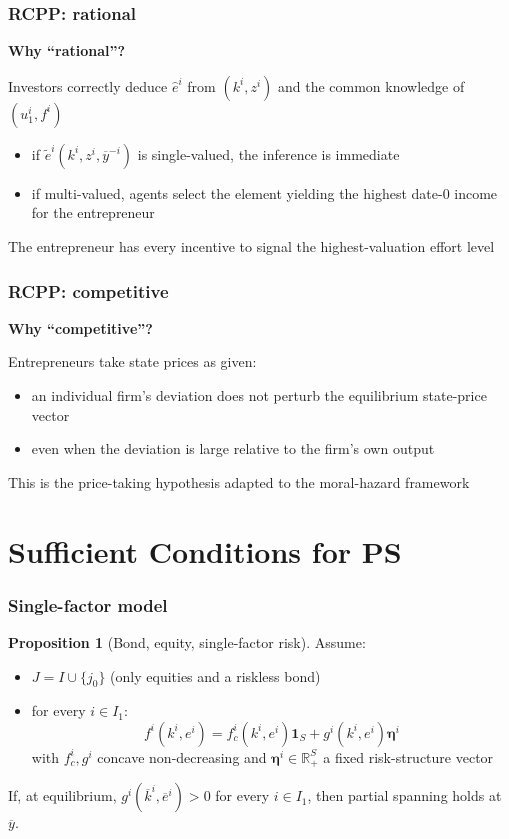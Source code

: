 \documentclass[blue]{beamer}
\def\R{\mathbb{R}}
\def\1{\mathbf{1}}
\theoremstyle{definition}
\theoremstyle{example}
\newtheorem*{proposition}{Proposition}
\begin{document}
\begin{frame}\frametitle{RCPP: rational}
\textbf{Why ``rational''?}
\bigskip

Investors correctly deduce $\widehat{e}^i$ from $(k^i, z^i)$ and the common knowledge of $(u^i_1, f^i)$
\bigskip

\begin{itemize}
\item if $\widetilde{e}^i(k^i, z^i, \overline{y}^{-i})$ is single-valued, the inference is immediate
\item if multi-valued, agents select the element yielding the highest date-$0$ income for the entrepreneur
\end{itemize}
\bigskip

The entrepreneur has every incentive to signal the highest-valuation effort level
\end{frame}

\begin{frame}\frametitle{RCPP: competitive}
\textbf{Why ``competitive''?}
\bigskip

Entrepreneurs take state prices as given:
\begin{itemize}
\item an individual firm's deviation does not perturb the equilibrium state-price vector
\item even when the deviation is large relative to the firm's own output
\end{itemize}
\bigskip

This is the price-taking hypothesis adapted to the moral-hazard framework
\end{frame}

\section{Sufficient Conditions for PS}

\begin{frame}\frametitle{Single-factor model}
\begin{proposition}[Bond, equity, single-factor risk]
Assume:
\begin{itemize}
\item[(a)] $J = I \cup \{j_0\}$ (only equities and a riskless bond)
\item[(b)] for every $i \in I_1$:
\begin{equation*}
f^i(k^i, e^i) = f^i_c(k^i, e^i) \1_S + g^i(k^i, e^i) \bm{\eta}^i
\end{equation*}
with $f^i_c, g^i$ concave non-decreasing and $\bm{\eta}^i \in \R_+^S$ a fixed risk-structure vector
\end{itemize}
If, at equilibrium, $g^i(\overline{k}^i, \overline{e}^i) > 0$ for every $i \in I_1$, then partial spanning holds at $\overline{y}$.
\end{proposition}
\end{frame}
\end{document}
